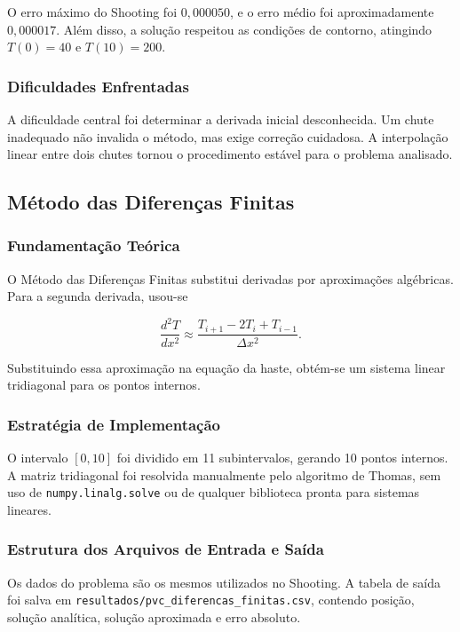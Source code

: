 O erro máximo do Shooting foi \(0{,}000050\), e o erro médio foi aproximadamente \(0{,}000017\). Além disso, a solução respeitou as condições de contorno, atingindo \(T(0)=40\) e \(T(10)=200\).

\subsubsection{Dificuldades Enfrentadas}

A dificuldade central foi determinar a derivada inicial desconhecida. Um chute inadequado não invalida o método, mas exige correção cuidadosa. A interpolação linear entre dois chutes tornou o procedimento estável para o problema analisado.

\subsection{Método das Diferenças Finitas}

\subsubsection{Fundamentação Teórica}

O Método das Diferenças Finitas substitui derivadas por aproximações algébricas. Para a segunda derivada, usou-se

\[
    \frac{d^2T}{dx^2}\approx\frac{T_{i+1}-2T_i+T_{i-1}}{\Delta x^2}.
\]

Substituindo essa aproximação na equação da haste, obtém-se um sistema linear tridiagonal para os pontos internos.

\subsubsection{Estratégia de Implementação}

O intervalo \([0,10]\) foi dividido em 11 subintervalos, gerando 10 pontos internos. A matriz tridiagonal foi resolvida manualmente pelo algoritmo de Thomas, sem uso de \texttt{numpy.linalg.solve} ou de qualquer biblioteca pronta para sistemas lineares.

\subsubsection{Estrutura dos Arquivos de Entrada e Saída}

Os dados do problema são os mesmos utilizados no Shooting. A tabela de saída foi salva em \texttt{resultados/pvc\_diferencas\_finitas.csv}, contendo posição, solução analítica, solução aproximada e erro absoluto.

